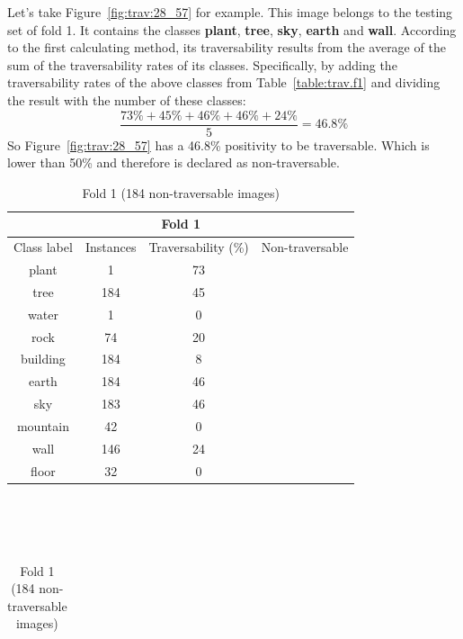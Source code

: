 \documentclass[12pt,a4paper,table,dvipsnames,tikz]{report}
\newcommand{\bl}[1]{{\hypersetup{linkcolor=blue}#1}}
\newcommand{\class}[1]{\textbf{\textcolor{#1}{#1}}} %
\begin{document}
	
	Let's take Figure~\bl{\ref{fig:trav:28_57}} for example. This image belongs to the 
	testing set of fold 1. It contains the classes \class{plant}, \class{tree}, \class{sky}, 
	\class{earth} and \class{wall}. According to the first calculating method, its 
	traversability results from the average of the sum of the traversability rates of its 
	classes. Specifically, by adding the traversability rates of the above classes from 
	Table~\bl{\ref{table:trav.f1}} and dividing the result with the number of these classes: 
	\[\frac{73\% + 45\% + 46\% + 46\% + 24\%}{5} = 46.8\%\]
	So Figure~\bl{\ref{fig:trav:28_57}} has a 46.8\% positivity to be traversable. Which is 
	lower than 50\% and therefore is declared as non-traversable.
	\\
	
	
	\begin{table}[h!]
		\begin{subtable}[h!]{\textwidth}
			\centering
			\begin{tabular}{|c|c|c|c|}
				\hline
				\multicolumn{4}{|c|}{Fold 1}\\
				\hline
				Class label & Instances & Traversability (\%) & Non-traversable\\
				\hline\hline
				plant & 1 & 73 &\\
				\hline
				\rowcolor{tree}
				tree & 184 & 45 & \checkmark\\
				\hline
				water & 1 & 0 & \checkmark\\
				\hline
				rock & 74 & 20 & \checkmark\\
				\hline
				building & 184 & 8 & \checkmark\\
				\hline
				\rowcolor{earth}
				earth & 184 & 46 & \checkmark\\
				\hline
				\rowcolor{sky}
				sky & 183 & 46 & \checkmark\\
				\hline
				mountain & 42 & 0 & \checkmark\\
				\hline
				wall & 146 & 24 & \checkmark\\
				\hline
				floor & 32 & 0 & \checkmark\\
				\hline
			\end{tabular}
			\caption{Fold 1 (184 non-traversable images)}
			\label{table:obst.f1}
		\end{subtable}
		\\\\\\
		\begin{subtable}[h!]{\textwidth}
			\centering
			\begin{tabular}{|c|c|c|c|}

\end{tabular}
\end{subtable}
\end{table}
\end{document}
